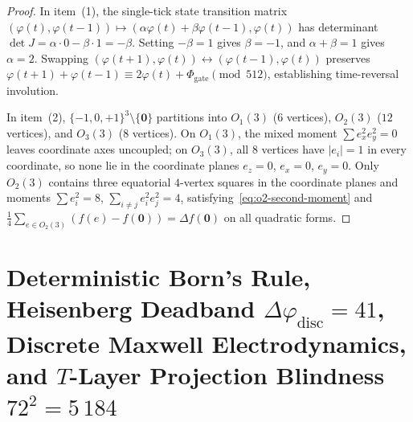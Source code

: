 \documentclass[11pt,a4paper]{article}
\theoremstyle{plain}
\theoremstyle{definition}
\begin{document}
\begin{proof}
In item~(1), the single-tick state transition matrix $(\varphi(t), \varphi(t-1)) \mapsto (\alpha\varphi(t) + \beta\varphi(t-1), \varphi(t))$ has determinant $\det J = \alpha\cdot 0 - \beta\cdot 1 = -\beta$. Setting $-\beta = 1$ gives $\beta = -1$, and $\alpha + \beta = 1$ gives $\alpha = 2$. Swapping $(\varphi(t+1), \varphi(t)) \leftrightarrow (\varphi(t-1), \varphi(t))$ preserves $\varphi(t+1) + \varphi(t-1) \equiv 2\varphi(t) + \Phi_{\mathrm{gate}} \pmod{512}$, establishing time-reversal involution.

In item~(2), $\{-1,0,+1\}^3 \setminus \{\mathbf{0}\}$ partitions into $O_1(3)$ ($6$ vertices), $O_2(3)$ ($12$ vertices), and $O_3(3)$ ($8$ vertices). On $O_1(3)$, the mixed moment $\sum e_x^2 e_y^2 = 0$ leaves coordinate axes uncoupled; on $O_3(3)$, all $8$ vertices have $|e_i| = 1$ in every coordinate, so none lie in the coordinate planes $e_z = 0$, $e_x = 0$, $e_y = 0$. Only $O_2(3)$ contains three equatorial $4$-vertex squares in the coordinate planes and moments $\sum e_i^2 = 8$, $\sum_{i\ne j} e_i^2 e_j^2 = 4$, satisfying~\eqref{eq:o2-second-moment} and $\frac{1}{4}\sum_{e\in O_2(3)}(f(e) - f(\mathbf{0})) = \Delta f(\mathbf{0})$ on all quadratic forms.
\end{proof}

\section{Deterministic Born's Rule, Heisenberg Deadband \texorpdfstring{$\Delta\varphi_{\mathrm{disc}}=41$}{dphi=41}, Discrete Maxwell Electrodynamics, and \texorpdfstring{$T$}{T}-Layer Projection Blindness \texorpdfstring{$72^2=5\,184$}{72^2=5184}}
\label{sec:born-maxwell-heisenberg}
\end{document}
